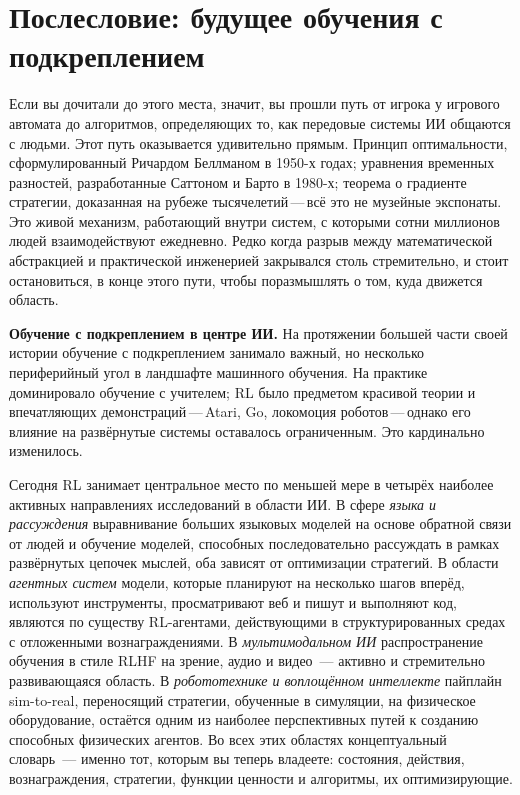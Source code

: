 \chapter*{Послесловие: будущее обучения с подкреплением}

Если вы дочитали до этого места, значит, вы прошли путь от игрока у игрового автомата до алгоритмов, определяющих то, как передовые системы ИИ общаются с людьми. Этот путь оказывается удивительно прямым. Принцип оптимальности, сформулированный Ричардом Беллманом в 1950-х годах; уравнения временных разностей, разработанные Саттоном и Барто в 1980-х; теорема о градиенте стратегии, доказанная на рубеже тысячелетий\,---\,всё это не музейные экспонаты. Это живой механизм, работающий внутри систем, с которыми сотни миллионов людей взаимодействуют ежедневно. Редко когда разрыв между математической абстракцией и практической инженерией закрывался столь стремительно, и стоит остановиться, в конце этого пути, чтобы поразмышлять о том, куда движется область.

\medskip

\textbf{Обучение с подкреплением в центре ИИ.}\quad
На протяжении большей части своей истории обучение с подкреплением занимало важный, но несколько периферийный угол в ландшафте машинного обучения. На практике доминировало обучение с учителем; RL было предметом красивой теории и впечатляющих демонстраций\,---\,Atari, Go, локомоция роботов\,---\,однако его влияние на развёрнутые системы оставалось ограниченным. Это кардинально изменилось.

Сегодня RL занимает центральное место по меньшей мере в четырёх наиболее активных направлениях исследований в области ИИ. В сфере \emph{языка и рассуждения} выравнивание больших языковых моделей на основе обратной связи от людей и обучение моделей, способных последовательно рассуждать в рамках развёрнутых цепочек мыслей, оба зависят от оптимизации стратегий. В области \emph{агентных систем} модели, которые планируют на несколько шагов вперёд, используют инструменты, просматривают веб и пишут и выполняют код, являются по существу RL-агентами, действующими в структурированных средах с отложенными вознаграждениями. В \emph{мультимодальном ИИ} распространение обучения в стиле RLHF на зрение, аудио и видео~--- активно и стремительно развивающаяся область. В \emph{робототехнике и воплощённом интеллекте} пайплайн sim-to-real, переносящий стратегии, обученные в симуляции, на физическое оборудование, остаётся одним из наиболее перспективных путей к созданию способных физических агентов. Во всех этих областях концептуальный словарь~--- именно тот, которым вы теперь владеете: состояния, действия, вознаграждения, стратегии, функции ценности и алгоритмы, их оптимизирующие.

